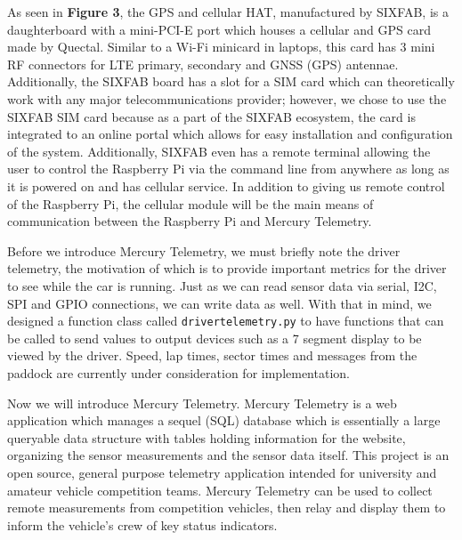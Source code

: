 \documentclass[12pt, letterpaper]{article}
\begin{document}
	
	\par As seen in \textbf{Figure 3}, the GPS and cellular HAT, manufactured by SIXFAB, is a daughterboard with a mini-PCI-E port which houses a cellular and GPS card made by Quectal. Similar to a Wi-Fi minicard in laptops, this card has 3 mini RF connectors for LTE primary, secondary and GNSS (GPS) antennae. Additionally, the SIXFAB board has a slot for a SIM card which can theoretically work with any major telecommunications provider; however, we chose to use the SIXFAB SIM card because as a part of the SIXFAB ecosystem, the card is integrated to an online portal which allows for easy installation and configuration of the system. Additionally, SIXFAB even has a remote terminal allowing the user to control the Raspberry Pi via the command line from anywhere as long as it is powered on and has cellular service. In addition to giving us remote control of the Raspberry Pi, the cellular module will be the  main means of communication between the Raspberry Pi and Mercury Telemetry. 
	\par Before we introduce Mercury Telemetry, we must briefly note the driver telemetry, the motivation of which is to provide important metrics for the driver to see while the car is running. Just as we can read sensor data via serial, I2C, SPI and GPIO connections, we can write data as well. With that in mind, we designed a function class called \texttt{drivertelemetry.py} to have functions that can be called to send values to output devices such as a 7 segment display to be viewed by the driver. Speed, lap times, sector times and messages from the paddock are currently under consideration for implementation.
	\par 
	Now we will introduce Mercury Telemetry. Mercury Telemetry is a web application which manages a sequel (SQL) database which is essentially a large queryable data structure with tables holding information for the website, organizing the sensor measurements and the sensor data itself. This project is an open source, general purpose telemetry application intended for university and amateur vehicle competition teams. Mercury Telemetry can be used to collect remote measurements from competition vehicles, then relay and display them to inform the vehicle's crew of key status indicators.
\end{document}
